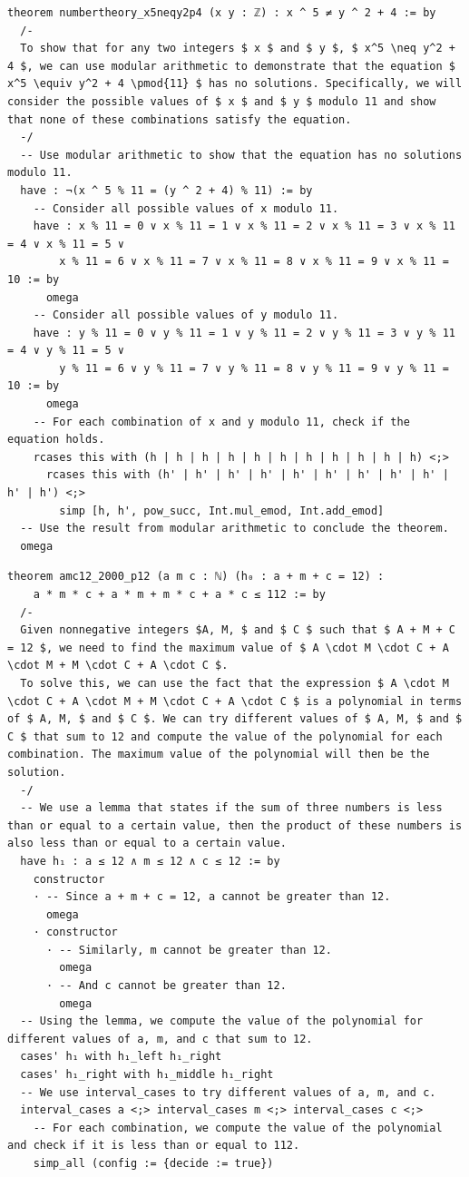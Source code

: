 \begin{lstlisting}[frame=single]
theorem numbertheory_x5neqy2p4 (x y : ℤ) : x ^ 5 ≠ y ^ 2 + 4 := by
  /-
  To show that for any two integers $ x $ and $ y $, $ x^5 \neq y^2 + 4 $, we can use modular arithmetic to demonstrate that the equation $ x^5 \equiv y^2 + 4 \pmod{11} $ has no solutions. Specifically, we will consider the possible values of $ x $ and $ y $ modulo 11 and show that none of these combinations satisfy the equation.
  -/
  -- Use modular arithmetic to show that the equation has no solutions modulo 11.
  have : ¬(x ^ 5 % 11 = (y ^ 2 + 4) % 11) := by
    -- Consider all possible values of x modulo 11.
    have : x % 11 = 0 ∨ x % 11 = 1 ∨ x % 11 = 2 ∨ x % 11 = 3 ∨ x % 11 = 4 ∨ x % 11 = 5 ∨
        x % 11 = 6 ∨ x % 11 = 7 ∨ x % 11 = 8 ∨ x % 11 = 9 ∨ x % 11 = 10 := by
      omega
    -- Consider all possible values of y modulo 11.
    have : y % 11 = 0 ∨ y % 11 = 1 ∨ y % 11 = 2 ∨ y % 11 = 3 ∨ y % 11 = 4 ∨ y % 11 = 5 ∨
        y % 11 = 6 ∨ y % 11 = 7 ∨ y % 11 = 8 ∨ y % 11 = 9 ∨ y % 11 = 10 := by
      omega
    -- For each combination of x and y modulo 11, check if the equation holds.
    rcases this with (h | h | h | h | h | h | h | h | h | h | h) <;>
      rcases this with (h' | h' | h' | h' | h' | h' | h' | h' | h' | h' | h') <;>
        simp [h, h', pow_succ, Int.mul_emod, Int.add_emod]
  -- Use the result from modular arithmetic to conclude the theorem.
  omega
\end{lstlisting}

\begin{lstlisting}[frame=single]
theorem amc12_2000_p12 (a m c : ℕ) (h₀ : a + m + c = 12) :
    a * m * c + a * m + m * c + a * c ≤ 112 := by
  /-
  Given nonnegative integers $A, M, $ and $ C $ such that $ A + M + C = 12 $, we need to find the maximum value of $ A \cdot M \cdot C + A \cdot M + M \cdot C + A \cdot C $.
  To solve this, we can use the fact that the expression $ A \cdot M \cdot C + A \cdot M + M \cdot C + A \cdot C $ is a polynomial in terms of $ A, M, $ and $ C $. We can try different values of $ A, M, $ and $ C $ that sum to 12 and compute the value of the polynomial for each combination. The maximum value of the polynomial will then be the solution.
  -/
  -- We use a lemma that states if the sum of three numbers is less than or equal to a certain value, then the product of these numbers is also less than or equal to a certain value.
  have h₁ : a ≤ 12 ∧ m ≤ 12 ∧ c ≤ 12 := by
    constructor
    · -- Since a + m + c = 12, a cannot be greater than 12.
      omega
    · constructor
      · -- Similarly, m cannot be greater than 12.
        omega
      · -- And c cannot be greater than 12.
        omega
  -- Using the lemma, we compute the value of the polynomial for different values of a, m, and c that sum to 12.
  cases' h₁ with h₁_left h₁_right
  cases' h₁_right with h₁_middle h₁_right
  -- We use interval_cases to try different values of a, m, and c.
  interval_cases a <;> interval_cases m <;> interval_cases c <;>
    -- For each combination, we compute the value of the polynomial and check if it is less than or equal to 112.
    simp_all (config := {decide := true})
\end{lstlisting}